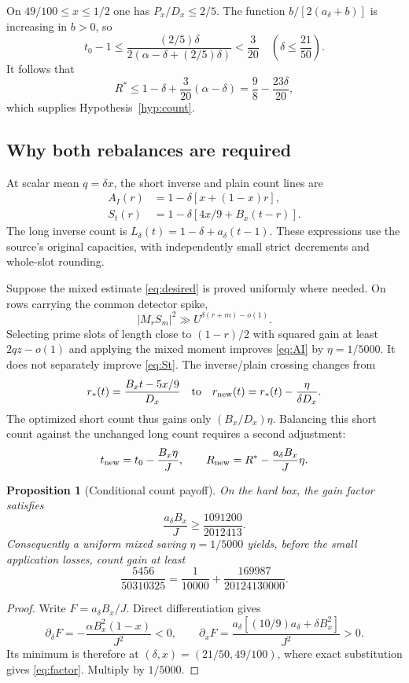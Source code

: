 \documentclass[11pt]{article}
\newtheorem{proposition}[theorem]{Proposition}
\theoremstyle{definition}
\theoremstyle{remark}
\numberwithin{equation}{section}
\begin{document}
On $49/100\le x\le1/2$ one has $P_x/D_x\le2/5$. The function
$b/[2(a_\delta+b)]$ is increasing in $b>0$, so
\[
t_0-1
\le\frac{(2/5)\delta}{2(\alpha-\delta+(2/5)\delta)}
<\frac3{20}
\quad\left(\delta\le\frac{21}{50}\right).
\]
It follows that
\[
R^*\le1-\delta+\frac3{20}(\alpha-\delta)
=\frac98-\frac{23\delta}{20},
\]
which supplies Hypothesis~\ref{hyp:count}.

\subsection{Why both rebalances are required}

At scalar mean $q=\delta x$, the short inverse and plain count lines
are
\begin{align}
A_I(r)&=1-\delta[x+(1-x)r],\label{eq:AI}\\
S_t(r)&=1-\delta[4x/9+B_x(t-r)].\label{eq:St}
\end{align}
The long inverse count is
$L_\delta(t)=1-\delta+a_\delta(t-1)$. These expressions use the
source's original capacities, with independently small strict
decrements and whole-slot rounding.

Suppose the mixed estimate \eqref{eq:desired} is proved uniformly
where needed. On rows carrying the common detector spike,
\[
|M_rS_m|^2\gg U^{\delta(r+m)-o(1)}.
\]
Selecting prime slots of length close to $(1-r)/2$ with squared
gain at least $2qz-o(1)$ and applying the mixed moment improves
\eqref{eq:AI} by $\eta=1/5000$. It does not separately improve
\eqref{eq:St}. The inverse/plain crossing changes from
\[
r_*(t)=\frac{B_xt-5x/9}{D_x}
\quad\hbox{to}\quad
r_{\rm new}(t)=r_*(t)-\frac{\eta}{\delta D_x}.
\]
The optimized short count thus gains only $(B_x/D_x)\eta$.
Balancing this short count against the unchanged long count requires
a second adjustment:
\begin{equation}\label{eq:rebalance}
t_{\rm new}=t_0-\frac{B_x\eta}{J},\qquad
R_{\rm new}=R^*-\frac{a_\delta B_x}{J}\eta.
\end{equation}

\begin{proposition}[Conditional count payoff]\label{prop:payoff}
On the hard box, the gain factor satisfies
\begin{equation}\label{eq:factor}
\frac{a_\delta B_x}{J}\ge\frac{1091200}{2012413}.
\end{equation}
Consequently a uniform mixed saving $\eta=1/5000$ yields, before
the small application losses, count gain at least
\[
\frac{5456}{50310325}
=\frac1{10000}+\frac{169987}{20124130000}.
\]
\end{proposition}
\begin{proof}
Write $F=a_\delta B_x/J$. Direct differentiation gives
\[
\partial_\delta F
=-\frac{\alpha B_x^2(1-x)}{J^2}<0,\qquad
\partial_xF=\frac{a_\delta[(10/9)a_\delta+\delta B_x^2]}{J^2}>0.
\]
Its minimum is therefore at
$(\delta,x)=(21/50,49/100)$, where exact substitution gives
\eqref{eq:factor}. Multiply by $1/5000$.
\end{proof}
\end{document}
